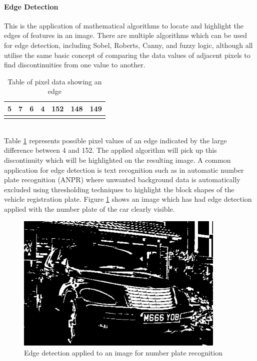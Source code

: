 	\paragraph{Edge Detection}
		This is the application of mathematical algorithms to locate and highlight the edges of features in an image. There are multiple algorithms which can be used for edge detection, including Sobel, Roberts, Canny, and fuzzy logic, although all utilise the same basic concept of comparing the data values of adjacent pixels to find discontinuities from one value to another.
		\begin{table}[h!]
			\centering
			\caption{Table of pixel data showing an edge}
			\label{tab:edgePixels}
			\begin{tabular}{|c|c|c|c|c|c|c|}
				\hline
				5&7&6&4&152&148&149\\
				\hline
				\cellcolor[HTML]{0D0D0D}&
				\cellcolor[HTML]{121212}&
				\cellcolor[HTML]{0F0F0F}&
				\cellcolor[HTML]{0a0a0a}&
				\cellcolor[HTML]{989898}&
				\cellcolor[HTML]{949494}&
				\cellcolor[HTML]{959595}\\
				\hline
			\end{tabular}
		\end{table}\\
		Table \ref{tab:edgePixels} represents possible pixel values of an edge indicated by the large difference between 4 and 152. The applied algorithm will pick up this discontinuity which will be highlighted on the resulting image. A common application for edge detection is text recognition such as in automatic number plate recognition (ANPR) \citep{anpr} where unwanted background data is automatically excluded using thresholding techniques to highlight the block shapes of the vehicle registration plate. Figure \ref{fig:anpr} shows an image which has had edge detection applied with the number plate of the car clearly visible.
		\begin{figure}[h!]
			\centering
			\includegraphics[width=10cm]{../images/anpr.jpg}
			\caption{Edge detection applied to an image for number plate recognition}
			\label{fig:anpr}
		\end{figure} 
